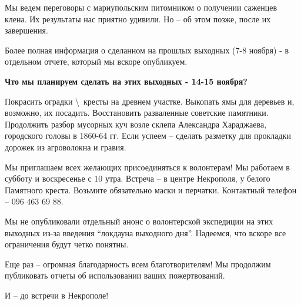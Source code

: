 Мы ведем переговоры с мариупольским питомником о получении саженцев клена. Их
результаты нас приятно удивили. Но – об этом позже, после их завершения.

Более полная информация о сделанном на прошлых выходных (7-8 ноября) - в
отдельном отчете, который мы вскоре опубликуем.

\textbf{Что мы планируем сделать на этих выходных - 14-15 ноября?}

Покрасить оградки \textbackslash\ кресты на древнем участке. Выкопать ямы для
деревьев и, возможно, их посадить. Восстановить разваленные советские
памятники. Продолжить разбор мусорных куч возле склепа Александра Хараджаева,
городского головы в 1860-64 гг. Если успеем – сделать разметку для прокладки
дорожек из агроволокна и гравия.

Мы приглашаем всех желающих присоединяться к волонтерам! Мы работаем в субботу
и воскресенье с 10 утра. Встреча – в центре Некрополя, у белого Памятного
креста. Возьмите обязательно маски и перчатки. Контактный телефон – 096 463 69
88.

Мы не опубликовали отдельный анонс о волонтерской экспедиции на этих выходных
из-за введения \enquote{локдауна выходного дня}. Надеемся, что вскоре все
ограничения будут четко понятны.

Еще раз – огромная благодарность всем благотворителям! Мы продолжим публиковать
отчеты об использовании ваших пожертвований.

И – до встречи в Некрополе! 🙂
